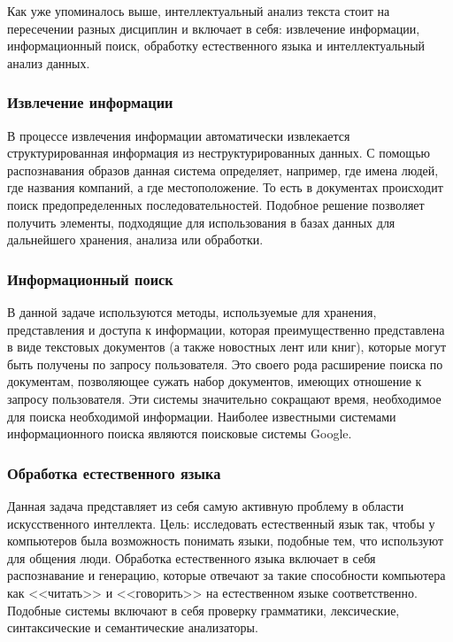 \documentclass[14pt]{matmex-diploma-custom}
\begin{document}
Как уже упоминалось выше, интеллектуальный анализ текста стоит на пересечении разных дисциплин и включает в себя: извлечение информации, информационный поиск, обработку естественного языка и интеллектуальный анализ данных.

\subsubsection{Извлечение информации}

В процессе извлечения информации автоматически извлекается структурированная информация из неструктурированных данных. С помощью распознавания образов данная система определяет, например, где имена людей, где названия компаний, а где местоположение. То есть в документах происходит поиск предопределенных последовательностей. Подобное решение позволяет получить элементы, подходящие для использования в базах данных для дальнейшего хранения, анализа или обработки.

\subsubsection{Информационный поиск}

В данной задаче используются методы, используемые для хранения, представления и доступа к информации, которая преимущественно представлена в виде текстовых документов (а также новостных лент или книг), которые могут быть получены по запросу пользователя. Это своего рода расширение поиска по документам, позволяющее сужать набор документов, имеющих отношение к запросу пользователя. Эти системы значительно сокращают время, необходимое для поиска необходимой информации. Наиболее известными системами информационного поиска являются поисковые системы Google.

\subsubsection{Обработка естественного языка}

Данная задача представляет из себя самую активную проблему в области искусственного интеллекта. Цель: исследовать естественный язык так, чтобы у компьютеров была возможность понимать языки, подобные тем, что используют для общения люди. Обработка естественного языка включает в себя распознавание и генерацию, которые отвечают за такие способности компьютера как <<читать>> и <<говорить>> на естественном языке соответственно. Подобные системы включают в себя проверку грамматики, лексические, синтаксические и семантические анализаторы.
\end{document}
